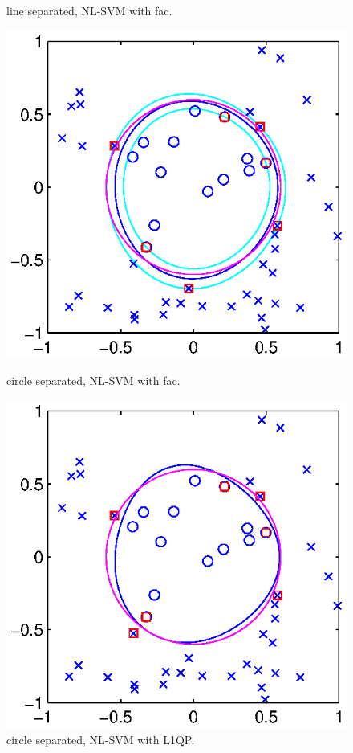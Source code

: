 \documentclass[11pt,a4paper]{article}
\theoremstyle{definition}
\begin{document}
\begin{figure}[htbp]
\begin{minipage}[t]{0.24\linewidth}
          \caption{\label{Fig:ex1_2}line separated, NL-SVM with fac.}
        \end{minipage}
        \begin{minipage}[t]{0.24\linewidth}
          \centering
          \includegraphics[width=1\textwidth]{1circlechol.eps}
          \caption{\label{Fig:ex1_3}circle separated, NL-SVM with fac.}
        \end{minipage}
        \begin{minipage}[t]{0.24\linewidth}
          \centering
          \includegraphics[width=1\textwidth]{1circlel1qp.eps}
          \caption{\label{Fig:ex1_4}circle separated, NL-SVM with L1QP.}
        \end{minipage}
      \end{figure}
\end{document}
